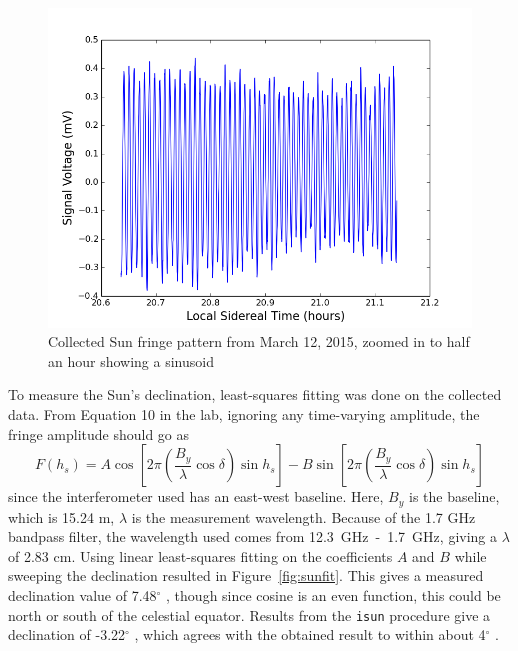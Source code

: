 \documentclass[12pt]{article}
\newcommand{\degree}{\ensuremath{^\circ} }
\begin{document}
\begin{figure}[h!]
\centering
\includegraphics[width=0.74\linewidth]{figures/sun_new_small.png}
\caption{Collected Sun fringe pattern from March 12, 2015, zoomed in to half an hour showing a sinusoid}
\label{fig:newsunsmall}
\end{figure}

To measure the Sun's declination, least-squares fitting was done on the collected data.
From Equation 10 in the lab, ignoring any time-varying amplitude, the fringe amplitude should go as
\begin{equation}
F(h_s) = A \cos\left[ 2 \pi \left( \frac{B_y}{\lambda} \cos \delta \right) \sin h_s \right ] - B \sin \left[ 2 \pi \left( \frac{B_y}{\lambda} \cos \delta \right) \sin h_s \right ]
\end{equation}
since the interferometer used has an east-west baseline.
Here, $B_y$ is the baseline, which is 15.24 m, $\lambda$ is the measurement wavelength.
Because of the 1.7 GHz bandpass filter, the wavelength used comes from 12.3~GHz~-~1.7~GHz, giving a $\lambda$ of 2.83 cm.
Using linear least-squares fitting on the coefficients $A$ and $B$ while sweeping the declination resulted in Figure~\ref{fig:sunfit}.
This gives a measured declination value of 7.48\degree, though since cosine is an even function, this could be north or south of the celestial equator.
Results from the \texttt{isun} procedure give a declination of -3.22\degree, which agrees with the obtained result to within about 4\degree.
\end{document}
